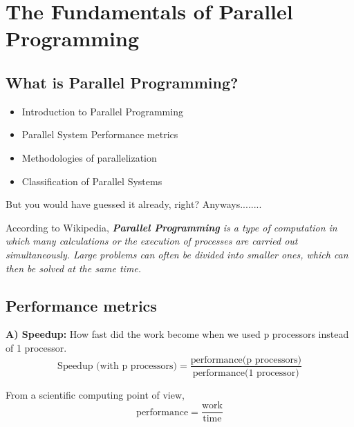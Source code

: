 \documentclass[12pt, a4paper]{report}
\begin{document}
\chapter{The Fundamentals of Parallel Programming}

\section{What is Parallel Programming?}
\begin{tcolorbox}[width=\textwidth,colback={white},title={In this chapter\dots},colbacktitle={lightslategray},coltitle=white]    
    \begin{itemize}
        \item Introduction to Parallel Programming
        \item Parallel System Performance metrics
        \item Methodologies of parallelization
        \item Classification of Parallel Systems
    \end{itemize}
 \end{tcolorbox}

But you would have guessed it already, right? Anyways........

According to Wikipedia, \emph {{\bfseries Parallel Programming} is a type of computation in which
many calculations or the execution of processes are carried out simultaneously. Large problems can often be divided 
into smaller ones, which can then be solved at the same time.}


\section{Performance metrics}
{\bfseries A) Speedup:} How fast did the work become when we used p processors instead of 1 processor.
\begin{equation*}
    \textrm{Speedup (with p processors)} = \frac{\textrm{performance(p processors)}}{\textrm{performance(1 processor)}}
\end{equation*}

From a scientific computing point of view,
\begin{equation*}
    \textrm{performance} = \frac{\textrm{work}}{\textrm{time}}
\end{equation*}
\end{document}
